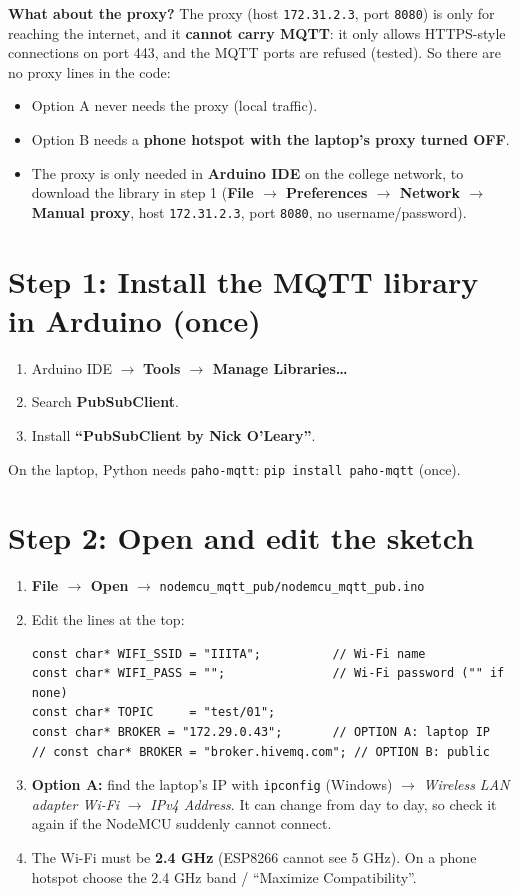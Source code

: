\documentclass[11pt]{article}
\newcommand{\menu}[1]{\textbf{#1}}
\begin{document}
\vspace{6pt}
\textbf{What about the proxy?} The proxy (host \texttt{172.31.2.3}, port \texttt{8080}) is only for reaching the internet, and it
\textbf{cannot carry MQTT}: it only allows HTTPS-style connections on port 443, and the MQTT ports are refused (tested).
So there are no proxy lines in the code:
\begin{itemize}
\item Option A never needs the proxy (local traffic).
\item Option B needs a \textbf{phone hotspot with the laptop's proxy turned OFF}.
\item The proxy is only needed in \textbf{Arduino IDE} on the college network, to download the library in step 1
(\menu{File $\rightarrow$ Preferences $\rightarrow$ Network $\rightarrow$ Manual proxy}, host \texttt{172.31.2.3}, port \texttt{8080}, no username/password).
\end{itemize}

\newpage
\section*{Step 1: Install the MQTT library in Arduino (once)}
\begin{enumerate}
\item Arduino IDE $\rightarrow$ \menu{Tools $\rightarrow$ Manage Libraries\dots}
\item Search \textbf{PubSubClient}.
\item Install \textbf{``PubSubClient by Nick O'Leary''}.
\end{enumerate}
On the laptop, Python needs \texttt{paho-mqtt}: \texttt{pip install paho-mqtt} (once).

\section*{Step 2: Open and edit the sketch}
\begin{enumerate}
\item \menu{File $\rightarrow$ Open} $\rightarrow$ \texttt{nodemcu\_mqtt\_pub/nodemcu\_mqtt\_pub.ino}
\item Edit the lines at the top:
\begin{verbatim}
const char* WIFI_SSID = "IIITA";          // Wi-Fi name
const char* WIFI_PASS = "";               // Wi-Fi password ("" if none)
const char* TOPIC     = "test/01";
const char* BROKER = "172.29.0.43";       // OPTION A: laptop IP
// const char* BROKER = "broker.hivemq.com"; // OPTION B: public
\end{verbatim}
\item \textbf{Option A:} find the laptop's IP with \texttt{ipconfig} (Windows) $\rightarrow$ \textit{Wireless LAN adapter Wi-Fi} $\rightarrow$ \textit{IPv4 Address}.
It can change from day to day, so check it again if the NodeMCU suddenly cannot connect.
\item The Wi-Fi must be \textbf{2.4 GHz} (ESP8266 cannot see 5 GHz). On a phone hotspot choose the 2.4 GHz band / ``Maximize Compatibility''.
\end{enumerate}
\end{document}
